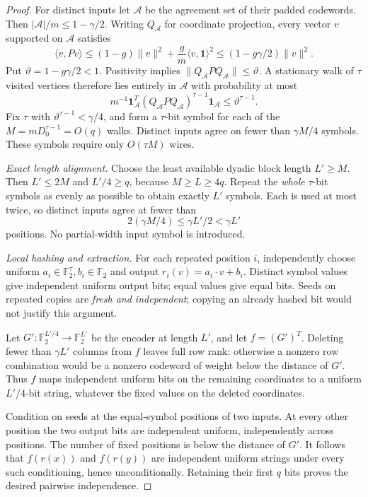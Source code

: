 \documentclass[11pt]{article}
\theoremstyle{remark}
\newcommand{\F}{\mathbb F_2}
\begin{document}
\begin{proof}
For distinct inputs let \(\mathcal A\) be the agreement set of their
padded codewords. Then \(|\mathcal A|/m\le1-\gamma/2\).
Writing \(Q_{\mathcal A}\) for coordinate projection, every vector
\(v\) supported on \(\mathcal A\) satisfies
\[
 \langle v,Pv\rangle
 \le (1-g)\|v\|^2+\frac gm\langle v,\mathbf1\rangle^2
 \le (1-g\gamma/2)\|v\|^2.
\]
Put \(\vartheta=1-g\gamma/2<1\).
Positivity implies \(\|Q_{\mathcal A}PQ_{\mathcal A}\|\le\vartheta\).
A stationary walk of \(\tau\) visited vertices therefore lies entirely
in \(\mathcal A\) with probability at most
\[
 m^{-1}\mathbf1_{\mathcal A}^T(Q_{\mathcal A}PQ_{\mathcal A})^{\tau-1}
 \mathbf1_{\mathcal A}
 \le\vartheta^{\tau-1}.
\]
Fix \(\tau\) with \(\vartheta^{\tau-1}<\gamma/4\), and form a
\(\tau\)-bit symbol for each of the \(M=mD_0^{\tau-1}=O(q)\) walks.
Distinct inputs agree on fewer than \(\gamma M/4\) symbols.
These symbols require only \(O(\tau M)\) wires.

\emph{Exact length alignment.}
Choose the least available dyadic block length \(L'\ge M\).
Then \(L'\le2M\) and \(L'/4\ge q\), because \(M\ge L\ge4q\).
Repeat the \emph{whole} \(\tau\)-bit symbols as evenly as possible
to obtain exactly \(L'\) symbols. Each is used at most twice,
so distinct inputs agree at fewer than
\[
 2(\gamma M/4)\le\gamma L'/2<\gamma L'
\]
positions. No partial-width input symbol is introduced.

\emph{Local hashing and extraction.}
For each repeated position \(i\), independently choose uniform
\(a_i\in\F^\tau,b_i\in\F\) and output
\(r_i(v)=a_i\cdot v+b_i\).
Distinct symbol values give independent uniform output bits;
equal values give equal bits. Seeds on repeated copies are
\emph{fresh and independent}; copying an already hashed bit would
not justify this argument.

Let \(G':\F^{L'/4}\to\F^{L'}\) be the encoder at length \(L'\),
and let \(f=(G')^T\).
Deleting fewer than \(\gamma L'\) columns from \(f\) leaves full
row rank: otherwise a nonzero row combination would be a nonzero
codeword of weight below the distance of \(G'\).
Thus \(f\) maps independent uniform bits on the remaining
coordinates to a uniform \(L'/4\)-bit string, whatever the
fixed values on the deleted coordinates.

Condition on seeds at the equal-symbol positions of two inputs.
At every other position the two output bits are independent uniform,
independently across positions. The number of fixed positions is
below the distance of \(G'\). It follows that \(f(r(x))\) and
\(f(r(y))\) are independent uniform strings under every such
conditioning, hence unconditionally. Retaining their first \(q\)
bits proves the desired pairwise independence.


\end{proof}
\end{document}
